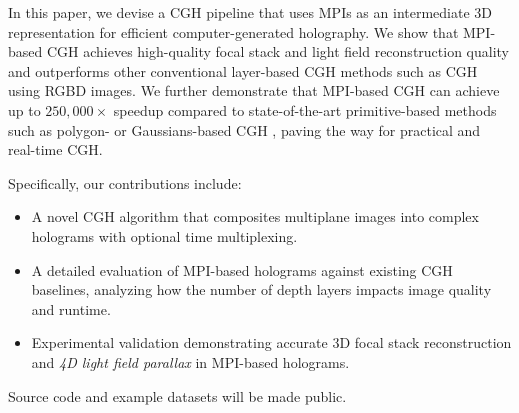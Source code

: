 In this paper, we devise a CGH pipeline that uses MPIs as an intermediate 3D representation for efficient computer-generated holography. We show that MPI-based CGH achieves high-quality focal stack and light field reconstruction quality and outperforms other conventional layer-based CGH methods such as CGH using RGBD images. We further demonstrate that MPI-based CGH can achieve up to $250,000\times$ speedup compared to state-of-the-art primitive-based methods such as polygon- or Gaussians-based CGH \cite{matsushima2005computer, matsushima2009extremely, matsushima2014silhouette, choi2025gaussian}, paving the way for practical and real-time CGH.

Specifically, our contributions include:
\begin{itemize}
\item A novel CGH algorithm that composites multiplane images into complex holograms with optional time multiplexing.
\item A detailed evaluation of MPI-based holograms against existing CGH baselines, analyzing how the number of depth layers impacts image quality and runtime.
\item Experimental validation demonstrating accurate 3D focal stack reconstruction and \textit{4D light field parallax} in MPI-based holograms.
\end{itemize}


Source code and example datasets will be made public.
